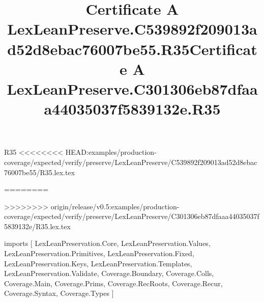 \begin{lexlean}{R35}
<<<<<<<< HEAD:examples/production-coverage/expected/verify/preserve/LexLeanPreserve/C539892f209013ad52d8ebac76007be55/R35.lex.tex
\title{Certificate A LexLeanPreserve.C539892f209013ad52d8ebac76007be55.R35}
========
\title{Certificate A LexLeanPreserve.C301306eb87dfaaa44035037f5839132e.R35}
>>>>>>>> origin/release/v0.5:examples/production-coverage/expected/verify/preserve/LexLeanPreserve/C301306eb87dfaaa44035037f5839132e/R35.lex.tex
\begin{coremodule}
imports [
  LexLeanPreservation.Core,
  LexLeanPreservation.Values,
  LexLeanPreservation.Primitives,
  LexLeanPreservation.Fixed,
  LexLeanPreservation.Keys,
  LexLeanPreservation.Templates,
  LexLeanPreservation.Validate,
  Coverage.Boundary,
  Coverage.Colls,
  Coverage.Main,
  Coverage.Prims,
  Coverage.RecRoots,
  Coverage.Recur,
  Coverage.Syntax,
  Coverage.Types
]


\end{coremodule}
\end{lexlean}
